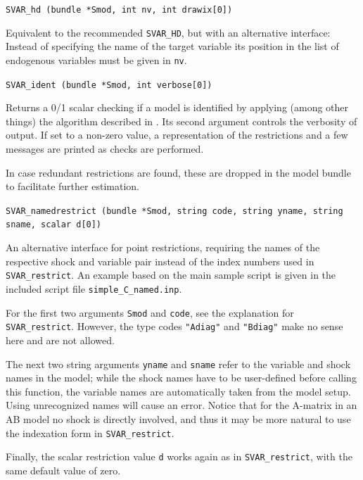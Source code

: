 \documentclass[a4paper,10pt]{article}
\newenvironment{funcdoc}[1]
{\noindent\hrulefill\newline\nopagebreak\texttt{#1}%
\nopagebreak\par\noindent\hrulefill%
\nopagebreak\par\nopagebreak\smallskip\nopagebreak\par}
{\bigskip}
\newcounter{script}[section]
\begin{document}
\begin{funcdoc}{SVAR\_hd (bundle *Smod, int nv, int drawix[0])}
\noindent Equivalent to the recommended \texttt{SVAR\_HD}, but with an alternative 
interface: 
Instead of specifying the name of the target variable its position in the 
list of endogenous variables must be given in \texttt{nv}.
\end{funcdoc}


\begin{funcdoc}{SVAR\_ident (bundle *Smod, int verbose[0])}
  \noindent Returns a 0/1 scalar checking if a model is identified by applying (among other things) 
  the algorithm described in \cite{AG}.  
  Its second argument controls the verbosity of output. 
  If set to a non-zero value, a representation of the restrictions and
  a few messages are printed as checks are performed.
  
  In case redundant restrictions are found, these are dropped in the 
  model bundle to facilitate further estimation.
\end{funcdoc}

\begin{funcdoc}{SVAR\_namedrestrict (bundle *Smod, string code, 
  string yname, string sname, scalar d[0])}
  \noindent An alternative interface for point restrictions, requiring the 
  names of the respective shock and variable pair instead of the index numbers 
  used in \texttt{SVAR\_restrict}. An example based on the main sample script 
  is given in the included script file \texttt{simple\_C\_named.inp}.
  
  For the first two arguments \texttt{Smod} and \texttt{code}, see the explanation
  for \texttt{SVAR\_restrict}. However, the type codes \texttt{"Adiag"} and 
  \texttt{"Bdiag"} make no sense here and are not allowed.
  
  The next two string arguments \texttt{yname} and 
  \texttt{sname} refer to the variable and shock names in the model; while the shock 
  names have to be user-defined before calling this function, the variable names 
  are automatically taken from the model setup. Using unrecognized names will cause 
  an error. Notice that for the A-matrix in an AB model no shock is directly 
  involved, and thus it may be more natural to use the indexation form in 
  \texttt{SVAR\_restrict}.
  
  Finally, the scalar restriction value \texttt{d} works again as in 
  \texttt{SVAR\_restrict}, with the same default value of zero.
\end{funcdoc}
\end{document}
